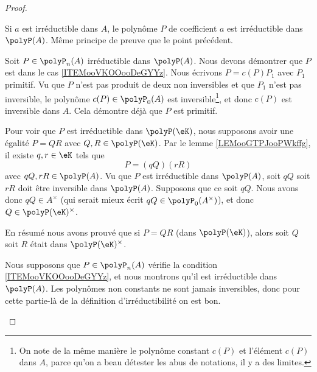 \begin{proof}
\begin{subproof}

		Si \( a\) est irréductible dans \( A\), le polynôme \( P\) de coefficient \( a\) est irréductible dans \( \polyP(A)\). Même principe de preuve que le point précédent.


		Soit \( P\in \polyP_n(A)\) irréductible dans \( \polyP(A)\). Nous devons démontrer que \( P\) est dans le cas \ref{ITEMooVKOOooDeGYYz}. Nous écrivons \( P=c(P)P_1\) avec \( P_1\) primitif. Vu que \( P\) n'est pas produit de deux non inversibles et que \( P_1\) n'est pas inversible, le polynôme \( c(P)\in\polyP_0(A)\) est inversible\footnote{On note de la même manière le polynôme constant \( c(P)\) et l'élément \( c(P)\) dans \( A\), parce qu'on a beau détester les abus de notations, il y a des limites.}, et donc \( c(P)\) est inversible dans \( A\). Cela démontre déjà que \( P\) est primitif.

		Pour voir que \( P\) est irréductible dans \( \polyP(\eK)\), nous supposons avoir une égalité \( P=QR\) avec \( Q,R\in \polyP(\eK)\). Par le lemme \ref{LEMooGTPJooPWkffg}, il existe \( q,r\in \eK\) tels que
		\begin{equation}
			P=(qQ)(rR)
		\end{equation}
		avec \( qQ, rR\in \polyP(A)\). Vu que \( P\) est irréductible dans \( \polyP(A)\), soit \( qQ\) soit \( rR\) doit être inversible dans \( \polyP(A)\). Supposons que ce soit \( qQ\). Nous avons donc \( qQ\in A^{\times}\) (qui serait mieux écrit \( qQ\in\polyP_0(A^{\times})\)), et donc \( Q\in \polyP(\eK)^{\times}\).

		En résumé nous avons prouvé que si \( P=QR\) (dans \( \polyP(\eK)\)), alors soit \( Q\) soit \( R\) était dans \( \polyP(\eK)^{\times}\).


		Nous supposons que \( P\in\polyP_n(A)\) vérifie la condition \ref{ITEMooVKOOooDeGYYz}, et nous montrons qu'il est irréductible dans \( \polyP(A)\). Les polynômes non constants ne sont jamais inversibles, donc pour cette partie-là de la définition d'irréductibilité on est bon.


\end{subproof}
\end{proof}
